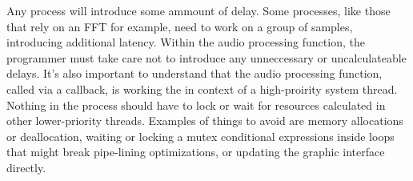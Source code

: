 Any process will introduce some ammount of delay. Some processes, like those that rely on an FFT for example, need to work on a group of samples, introducing additional latency. Within the audio processing function, the programmer must take care not to introduce any unneccessary or uncalculateable delays. It's also important to understand that the audio processing function, called via a callback, is working the in context of a high-proirity system thread. Nothing in the process should have to lock or wait for resources calculated in other lower-priority threads. Examples of things to avoid are memory allocations or deallocation, waiting or locking a mutex conditional expressions inside loops that might break pipe-lining optimizations\cite{realtime-architectures}, or updating the graphic interface directly.

